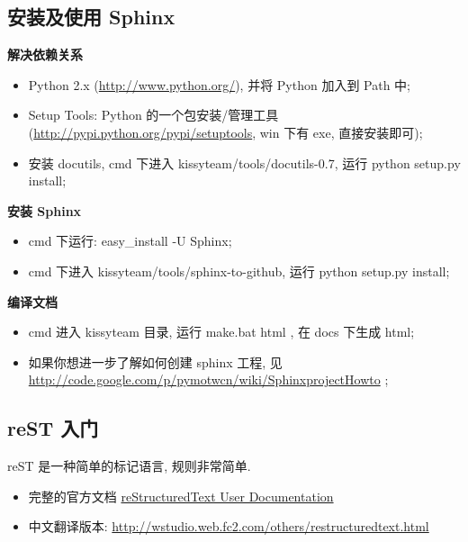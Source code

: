 \documentclass[letterpaper,10pt,english]{sphinxmanual}
\begin{document}
\subsection{安装及使用 Sphinx}
\label{tools/use-sphinx:sphinx-install}\label{tools/use-sphinx:id1}
\textbf{解决依赖关系}
\begin{itemize}
\item {}
Python 2.x (\href{http://www.python.org/}{http://www.python.org/}), 并将 Python 加入到 Path 中;

\item {}
Setup Tools: Python 的一个包安装/管理工具(\href{http://pypi.python.org/pypi/setuptools}{http://pypi.python.org/pypi/setuptools}, win 下有 exe, 直接安装即可);

\item {}
安装 docutils, cmd 下进入 kissyteam/tools/docutils-0.7, 运行 python setup.py install;

\end{itemize}

\textbf{安装 Sphinx}
\begin{itemize}
\item {}
cmd 下运行: easy\_install -U Sphinx;

\item {}
cmd 下进入 kissyteam/tools/sphinx-to-github, 运行 python setup.py install;

\end{itemize}

\textbf{编译文档}
\begin{itemize}
\item {}
cmd 进入 kissyteam 目录, 运行 make.bat html , 在 docs 下生成 html;

\item {}
如果你想进一步了解如何创建 sphinx 工程, 见 \href{http://code.google.com/p/pymotwcn/wiki/SphinxprojectHowto}{http://code.google.com/p/pymotwcn/wiki/SphinxprojectHowto} ;

\end{itemize}


\subsection{reST 入门}
\label{tools/use-sphinx:rst-primer}\label{tools/use-sphinx:rest}
reST 是一种简单的标记语言, 规则非常简单.



\begin{itemize}
\item {}
完整的官方文档 \href{http://docutils.sourceforge.net/rst.html}{reStructuredText User Documentation}

\item {}
中文翻译版本: \href{http://wstudio.web.fc2.com/others/restructuredtext.html}{http://wstudio.web.fc2.com/others/restructuredtext.html}

\end{itemize}
\end{document}
